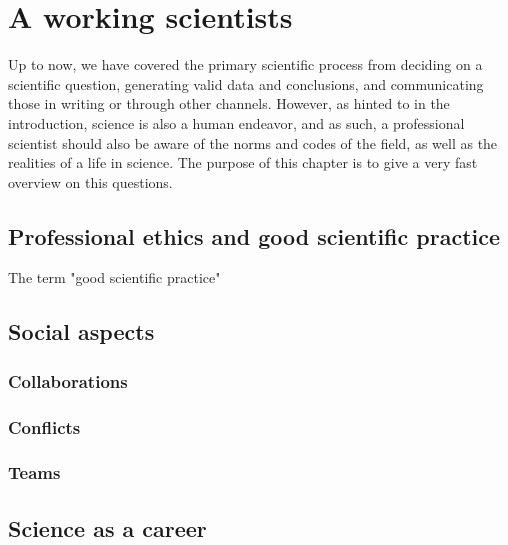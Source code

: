 \documentclass{tufte-book}
\begin{document}
\chapter{A working scientists}

Up to now, we have covered the primary scientific process from deciding on a scientific question, generating valid data and conclusions, and communicating those in writing or through other channels. However, as hinted to in the introduction, science is also a human endeavor, and as such, a professional scientist should also be aware of the norms and codes of the field, as well as the realities of a life in science. The purpose of this chapter is to give a very fast overview on this questions.

\section{Professional ethics and good scientific practice}

The term "good scientific practice"

\section{Social aspects}

\subsection{Collaborations}

\subsection{Conflicts}

\subsection{Teams}


\section{Science as a career}



\end{document}
